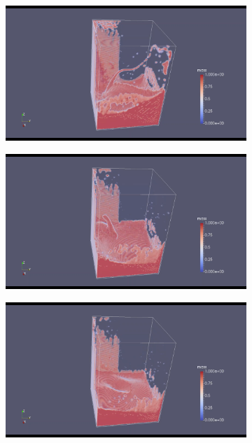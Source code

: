 \documentclass[10pt,a4paper,notitlepage]{article}
\begin{document}
\begin{figure}[H]
\begin{subfigure}{0.25\textwidth}
\end{subfigure}
\begin{subfigure}{0.25\textwidth}
  \includegraphics[width=1.0\linewidth]{dam/6.png}
\end{subfigure}
\centering
\begin{subfigure}{0.25\textwidth}
  \includegraphics[width=1.0\linewidth]{dam/7.png}
\end{subfigure}%
\begin{subfigure}{0.25\textwidth}
  \includegraphics[width=1.0\linewidth]{dam/8.png}

\end{subfigure}
\end{figure}
\end{document}
